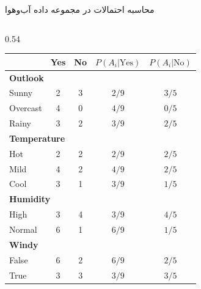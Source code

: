\begin{frame}{محاسبه احتمالات در مجموعه داده آب‌وهوا}{}
\begin{columns}[T]
\begin{column}{0.54\textwidth}
\begin{latin}
\begin{tabular}{|l|cc|cc|}
        & Yes & No & $P(A_i|\text{Yes})$ & $P(A_i|\text{No})$ \\
        \hline
        \multicolumn{5}{|l|}{\textbf{Outlook}} \\
        Sunny & 2 & 3 & $2/9$ & $3/5$ \\
        Overcast & 4 & 0 & $4/9$ & $0/5$ \\
        Rainy & 3 & 2 & $3/9$ & $2/5$ \\
        \hline
        \multicolumn{5}{|l|}{\textbf{Temperature}} \\
        Hot & 2 & 2 & $2/9$ & $2/5$ \\
        Mild & 4 & 2 & $4/9$ & $2/5$ \\
        Cool & 3 & 1 & $3/9$ & $1/5$ \\
        \hline
        \multicolumn{5}{|l|}{\textbf{Humidity}} \\
        High & 3 & 4 & $3/9$ & $4/5$ \\
        Normal & 6 & 1 & $6/9$ & $1/5$ \\
        \hline
        \multicolumn{5}{|l|}{\textbf{Windy}} \\
        False & 6 & 2 & $6/9$ & $2/5$ \\
        True & 3 & 3 & $3/9$ & $3/5$ \\
        \hline
      \end{tabular}
      \end{latin}
    \end{column}
  \end{columns}
\end{frame}

